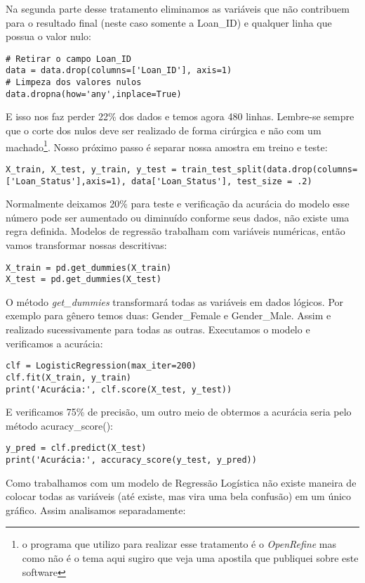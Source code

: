 Na segunda parte desse tratamento eliminamos as variáveis que não contribuem para o resultado final (neste caso somente a Loan\_ID) e qualquer linha que possua o valor nulo:
\begin{lstlisting}[]
# Retirar o campo Loan_ID
data = data.drop(columns=['Loan_ID'], axis=1)
# Limpeza dos valores nulos
data.dropna(how='any',inplace=True)
\end{lstlisting}

E isso nos faz perder 22\% dos dados e temos agora 480 linhas. Lembre-se sempre que o corte dos nulos deve ser realizado de forma cirúrgica e não com um machado\footnote{o programa que utilizo para realizar esse tratamento é o \textit{OpenRefine} mas como não é o tema aqui sugiro que veja uma apostila que publiquei sobre este software}. Nosso próximo passo é separar nossa amostra em treino e teste:
\begin{lstlisting}[]
X_train, X_test, y_train, y_test = train_test_split(data.drop(columns=['Loan_Status'],axis=1), data['Loan_Status'], test_size = .2)
\end{lstlisting}

Normalmente deixamos 20\% para teste e verificação da acurácia do modelo esse número pode ser aumentado ou diminuído conforme seus dados, não existe uma regra definida. Modelos de regressão trabalham com variáveis numéricas, então vamos transformar nossas descritivas:
\begin{lstlisting}[]
X_train = pd.get_dummies(X_train)
X_test = pd.get_dummies(X_test)
\end{lstlisting}

O método \textit{get\_dummies} transformará todas as variáveis em dados lógicos. Por exemplo para gênero temos duas: Gender\_Female e Gender\_Male. Assim e realizado sucessivamente para todas as outras. Executamos o modelo e verificamos a acurácia:
\begin{lstlisting}[]
clf = LogisticRegression(max_iter=200)
clf.fit(X_train, y_train)
print('Acurácia:', clf.score(X_test, y_test))
\end{lstlisting}

E verificamos 75\% de precisão, um outro meio de obtermos a acurácia seria pelo método acuracy\_score():
\begin{lstlisting}[]
y_pred = clf.predict(X_test)
print('Acurácia:', accuracy_score(y_test, y_pred))
\end{lstlisting}

Como trabalhamos com um modelo de Regressão Logística não existe maneira de colocar todas as variáveis (até existe, mas vira uma bela confusão) em um único gráfico. Assim analisamos separadamente:

